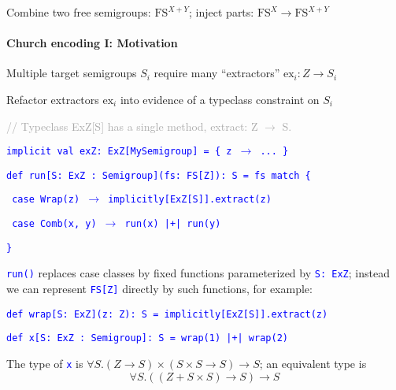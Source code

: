 Combine two free semigroups: $\text{FS}^{X+Y}$; inject parts: $\text{FS}^{X}\rightarrow\text{FS}^{X+Y}$ 


\paragraph{Church encoding I: Motivation}

Multiple target semigroups $S_{i}$ require many \textsf{``}extractors\textsf{''}
$\text{ex}_{i}:Z\rightarrow S_{i}$

Refactor extractors $\text{ex}_{i}$ into evidence of a typeclass
constraint on $S_{i}$

\textcolor{darkgray}{\footnotesize{}// Typeclass ExZ{[}S{]} has a
single method, extract: Z $\rightarrow$ S.}{\footnotesize\par}

\texttt{\textcolor{blue}{\footnotesize{}implicit val exZ: ExZ{[}MySemigroup{]}
= \{ z $\rightarrow$ ... \}}}{\footnotesize\par}

\texttt{\textcolor{blue}{\footnotesize{}def run{[}S: ExZ : Semigroup{]}(fs: FS{[}Z{]}): S
= fs match \{}}{\footnotesize\par}

\texttt{\textcolor{blue}{\footnotesize{}  case Wrap(z) $\rightarrow$
implicitly{[}ExZ{[}S{]}{]}.extract(z)}}{\footnotesize\par}

\texttt{\textcolor{blue}{\footnotesize{}  case Comb(x, y) $\rightarrow$
run(x) |+| run(y)}}{\footnotesize\par}

\texttt{\textcolor{blue}{\footnotesize{}\}}}{\footnotesize\par}

\texttt{\textcolor{blue}{\footnotesize{}run()}} replaces case classes
by fixed functions parameterized by \texttt{\textcolor{blue}{\footnotesize{}S:~ExZ}};
instead we can represent \texttt{\textcolor{blue}{\footnotesize{}FS{[}Z{]}}}
directly by such functions, for example:

\texttt{\textcolor{blue}{\footnotesize{}def wrap{[}S: ExZ{]}(z: Z): S
= implicitly{[}ExZ{[}S{]}{]}.extract(z)}}{\footnotesize\par}

\texttt{\textcolor{blue}{\footnotesize{}def x{[}S: ExZ : Semigroup{]}: S
= wrap(1) |+| wrap(2)}}{\footnotesize\par}

The type of \texttt{\textcolor{blue}{\footnotesize{}x}} is {\footnotesize{}$\forall S.\left(Z\rightarrow S\right)\times\left(S\times S\rightarrow S\right)\rightarrow S$};
an equivalent type is{\footnotesize{}
\[
\forall S.\left(\left(Z+S\times S\right)\rightarrow S\right)\rightarrow S
\]
}{\footnotesize\par}

